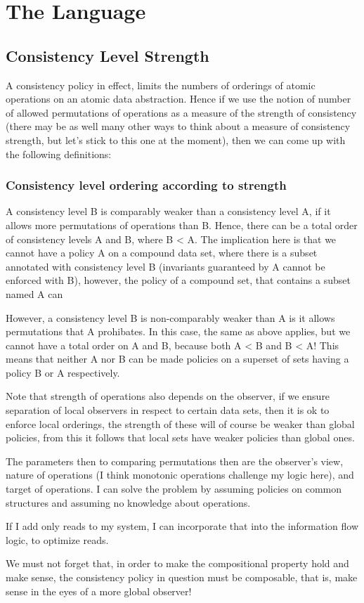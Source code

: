 

\section{The  Language}
\subsection{Consistency Level Strength}
A consistency policy in effect, limits the numbers of orderings of atomic
operations on an atomic data abstraction. Hence if we use the notion of number
of allowed permutations of operations as a measure of the strength of
consistency (there may be as well many other ways to think about a measure of
consistency strength, but let's stick to this one at the moment), then we can
come up with the following definitions:

\subsubsection{Consistency level ordering according to strength}
A consistency level B is comparably weaker than a consistency level A, if it
allows more permutations of operations than B. Hence, there can be a total order
of consistency levels A and B, where B < A. The implication here is that we
cannot have a policy A on a compound data set, where there is a subset annotated
with consistency level B (invariants guaranteed by A cannot be enforced with B),
however, the policy of a compound set, that contains a subset named A can 

However, a consistency level B is non-comparably weaker than A is it allows
permutations that A prohibates. In this case, the same as above applies, but we
cannot have a total order on A and B, because both A < B and B < A! This means
that neither A nor B can be made policies on a superset of sets having a policy
B or A respectively. 

Note that strength of operations also depends on the observer, if we ensure
separation of local observers in respect to certain data sets, then it is ok to
enforce local orderings, the strength of these will of course be weaker than
global policies, from this it follows that local sets have weaker policies than
global ones.

The parameters then to comparing permutations then are the observer's view,
nature of operations (I think monotonic operations challenge my logic here), and
target of operations. I can solve the problem by assuming policies on common
structures and assuming no knowledge about operations. 

If I add only reads to my system, I can incorporate that into the information flow logic,
to optimize reads. 

We must not forget that, in order to make the compositional property hold and
make sense, the consistency policy in question must be composable, that is, make
sense in the eyes of a more global observer!

